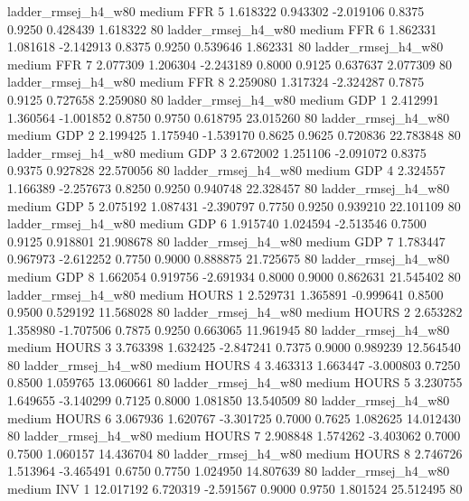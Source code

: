    ladder_rmsej_h4_w80     medium      FFR                 5  1.618322 0.943302 -2.019106 0.8375 0.9250  0.428439    1.618322 80
   ladder_rmsej_h4_w80     medium      FFR                 6  1.862331 1.081618 -2.142913 0.8375 0.9250  0.539646    1.862331 80
   ladder_rmsej_h4_w80     medium      FFR                 7  2.077309 1.206304 -2.243189 0.8000 0.9125  0.637637    2.077309 80
   ladder_rmsej_h4_w80     medium      FFR                 8  2.259080 1.317324 -2.324287 0.7875 0.9125  0.727658    2.259080 80
   ladder_rmsej_h4_w80     medium      GDP                 1  2.412991 1.360564 -1.001852 0.8750 0.9750  0.618795   23.015260 80
   ladder_rmsej_h4_w80     medium      GDP                 2  2.199425 1.175940 -1.539170 0.8625 0.9625  0.720836   22.783848 80
   ladder_rmsej_h4_w80     medium      GDP                 3  2.672002 1.251106 -2.091072 0.8375 0.9375  0.927828   22.570056 80
   ladder_rmsej_h4_w80     medium      GDP                 4  2.324557 1.166389 -2.257673 0.8250 0.9250  0.940748   22.328457 80
   ladder_rmsej_h4_w80     medium      GDP                 5  2.075192 1.087431 -2.390797 0.7750 0.9250  0.939210   22.101109 80
   ladder_rmsej_h4_w80     medium      GDP                 6  1.915740 1.024594 -2.513546 0.7500 0.9125  0.918801   21.908678 80
   ladder_rmsej_h4_w80     medium      GDP                 7  1.783447 0.967973 -2.612252 0.7750 0.9000  0.888875   21.725675 80
   ladder_rmsej_h4_w80     medium      GDP                 8  1.662054 0.919756 -2.691934 0.8000 0.9000  0.862631   21.545402 80
   ladder_rmsej_h4_w80     medium    HOURS                 1  2.529731 1.365891 -0.999641 0.8500 0.9500  0.529192   11.568028 80
   ladder_rmsej_h4_w80     medium    HOURS                 2  2.653282 1.358980 -1.707506 0.7875 0.9250  0.663065   11.961945 80
   ladder_rmsej_h4_w80     medium    HOURS                 3  3.763398 1.632425 -2.847241 0.7375 0.9000  0.989239   12.564540 80
   ladder_rmsej_h4_w80     medium    HOURS                 4  3.463313 1.663447 -3.000803 0.7250 0.8500  1.059765   13.060661 80
   ladder_rmsej_h4_w80     medium    HOURS                 5  3.230755 1.649655 -3.140299 0.7125 0.8000  1.081850   13.540509 80
   ladder_rmsej_h4_w80     medium    HOURS                 6  3.067936 1.620767 -3.301725 0.7000 0.7625  1.082625   14.012430 80
   ladder_rmsej_h4_w80     medium    HOURS                 7  2.908848 1.574262 -3.403062 0.7000 0.7500  1.060157   14.436704 80
   ladder_rmsej_h4_w80     medium    HOURS                 8  2.746726 1.513964 -3.465491 0.6750 0.7750  1.024950   14.807639 80
   ladder_rmsej_h4_w80     medium      INV                 1 12.017192 6.720319 -2.591567 0.9000 0.9750  1.801524   25.512495 80
